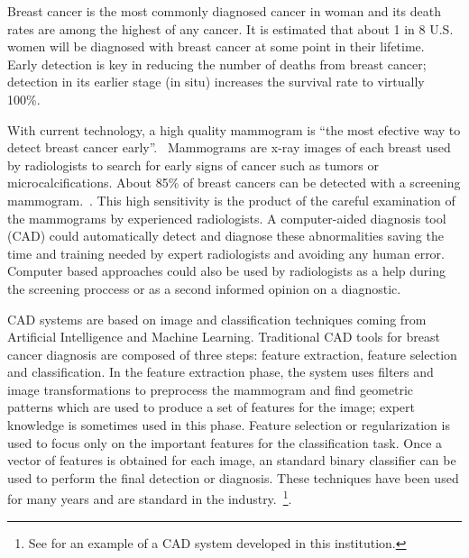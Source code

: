Breast cancer is the most commonly diagnosed cancer in woman and its death rates are among the highest of any cancer. It is estimated that about 1 in 8 U.S. women will be diagnosed with breast cancer at some point in their lifetime.~\cite{CSR2014} Early detection is key in reducing the number of deaths from breast cancer; detection in its earlier stage (in situ) increases the survival rate to virtually 100\%.~\cite{CSR2014}

With current technology, a high quality mammogram is ``the most efective way to detect breast cancer early''.~\cite{MammogramFactSheet2014} Mammograms are x-ray images of each breast used by radiologists to search for early signs of cancer such as tumors or microcalcifications. About 85\% of breast cancers can be detected with a screening mammogram.~\cite{PerformanceMammography2013}. This high sensitivity is the product of the careful examination of the mammograms by experienced radiologists. A computer-aided diagnosis tool (CAD) could automatically detect and diagnose these abnormalities saving the time and training needed by expert radiologists and avoiding any human error. Computer based approaches could also be used by radiologists as a help during the screening proccess or as a second informed opinion on a diagnostic.

CAD systems are based on image and classification techniques coming from Artificial Intelligence and Machine Learning. Traditional CAD tools for breast cancer diagnosis are composed of three steps: feature extraction, feature selection and classification. In the feature extraction phase, the system uses filters and image transformations to preprocess the mammogram and find geometric patterns which are used to produce a set of features for the image; expert knowledge is sometimes used in this phase. Feature selection or regularization is used to focus only on the important features for the classification task. Once a vector of features is obtained for each image, an standard binary classifier can be used to perform the final detection or diagnosis. These techniques have been used for many years and are standard in the industry.~\footnote{See \cite{doctorado} for an example of a CAD system developed in this institution.}.

